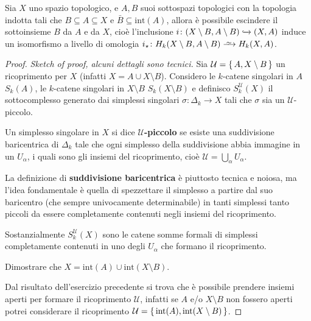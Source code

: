 \begin{theorem}
  Sia $ X $ uno spazio topologico, e $ A, B $ suoi sottospazi topologici
  con la topologia indotta tali che $ B \subseteq A \subseteq X $ e $ \bar{B} \subseteq \mathrm{int}(A) $,
  allora è possibile escindere il sottoinsieme $ B $ da $ A $ e da $ X $, cioè
  l'inclusione $ i \colon (X \setminus B, A \setminus B) \xhookrightarrow{} (X,A) $ induce un isomorfismo a livello
  di omologia $ i_\star \colon H_k(X \setminus B, A \setminus B) \homoto H_k(X,A) $.
\end{theorem}
\begin{proof} \emph{Sketch of proof, alcuni dettagli sono tecnici.}
  Sia $ \mathcal{U} = \set{A, X \setminus B} $ un ricoprimento per $ X $ (infatti
  $ X = A \cup X \setminus B $). Considero le $ k $-catene singolari in $ A $ $ S_k(A) $,
  le $ k $-catene singolari in $ X \setminus B $ $ S_k(X \setminus B) $ e definisco
  $ S_k^\mathcal{U}(X) $ il sottocomplesso generato dai simplessi singolari
  $ \sigma \colon \Delta_k \to X $ tali che $ \sigma $ sia un $ \mathcal{U} $-piccolo.

  \begin{definition}
    Un simplesso singolare in $ X $ si dice
    \textbf{$ \mathcal{U} $-piccolo} se esiste
    una suddivisione baricentrica di $ \Delta_k $ tale che ogni simplesso della
    suddivisione abbia immagine in un $ U_\alpha $, i quali sono gli insiemi del
    ricoprimento, cioè $ \mathcal{U} = \bigcup_\alpha U_\alpha $.
  \end{definition}

  \begin{definition}
    La definizione di \textbf{suddivisione baricentrica} è piuttosto tecnica e noiosa, ma l'idea fondamentale è
    quella di spezzettare il simplesso a partire dal suo baricentro (che sempre
    univocamente determinabile) in tanti simplessi tanto piccoli da essere
    completamente contenuti negli insiemi del ricoprimento.
  \end{definition}
  Sostanzialmente $ S_k^\mathcal{U}(X) $ sono le catene somme formali di simplessi
  completamente contenuti in uno degli $ U_\alpha $ che formano il ricoprimento.
  \begin{exercise}
    Dimostrare che $ X = \mathrm{int}(A) \cup \mathrm{int}(X \setminus B) $.
  \end{exercise}
  Dal risultato dell'esercizio precedente si trova che è possibile prendere
  insiemi aperti per formare il ricoprimento $ \mathcal{U} $, infatti se $ A $
  e/o $ X \setminus B $ non fossero aperti potrei considerare il ricoprimento
  $ \mathcal{U} = \set{ \mathrm{int}(A), \mathrm{int}(X \setminus B)} $.


\end{proof}
